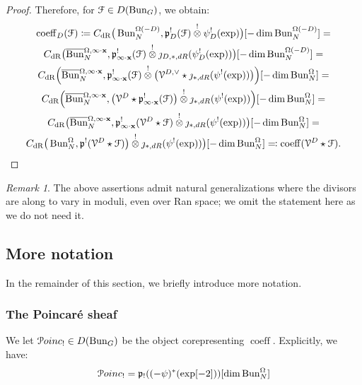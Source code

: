 \documentclass[reqno,11pt]{amsart}
\numberwithin{equation}{subsection}
\theoremstyle{remark}
\newtheorem{rem}[thm]{Remark}
\newcommand{\sF}{{\EuScript F}}
\newcommand{\sP}{{\EuScript P}}
\newcommand{\sV}{{\EuScript V}}
\newcommand{\fp}{{\mathfrak p}}
\newcommand{\on}{\operatorname}
\newcommand{\ol}[1]{\overline{#1}{}}
\newcommand{\Bun}{\on{Bun}}
\newcommand{\coeff}{\on{coeff}}
\newcommand{\Poinc}{\sP oinc}
\newcommand{\dR}{\on{dR}}
\begin{document}
\begin{proof}
Therefore, for $\sF \in D(\Bun_G)$, we obtain:
%
\[
\begin{gathered}
\coeff_D(\sF) \coloneqq 
C_{\dR}\big(\Bun_N^{\Omega(-D)},\fp_D^!(\sF) \overset{!}{\otimes} \psi_D^!(\exp)\big)
[-\dim \Bun_N^{\Omega(-D)}] = \\
C_{\dR}\big(\ol{\Bun}_N^{\Omega,\infty\cdot \bold{x}},
\fp_{\infty\cdot \bold{x}}^!(\sF) \overset{!}{\otimes} 
\jmath_{D,*,dR}(\psi_D^!(\exp))\big) 
[-\dim \Bun_N^{\Omega(-D)}] = \\
C_{\dR}\Big(\ol{\Bun}_N^{\Omega,\infty\cdot \bold{x}},
\fp_{\infty\cdot \bold{x}}^!(\sF) \overset{!}{\otimes} 
\big(\sV^{D,\vee} \star \jmath_{*,dR}(\psi^!(\exp))\big)\Big)
[-\dim \Bun_N^{\Omega}]
= \\
C_{\dR}\Big(\ol{\Bun}_N^{\Omega,\infty\cdot \bold{x}},
\big(\sV^{D} \star \fp_{\infty\cdot \bold{x}}^!(\sF)\big) \overset{!}{\otimes} 
\jmath_{*,dR}(\psi^!(\exp))\Big)
[-\dim \Bun_N^{\Omega}] = \\
C_{\dR}\big(\ol{\Bun}_N^{\Omega,\infty\cdot \bold{x}},
\fp_{\infty\cdot \bold{x}}^!(\sV^D \star \sF) \overset{!}{\otimes} 
 \jmath_{*,dR}(\psi^!(\exp))\big)
[-\dim \Bun_N^{\Omega}] = \\
C_{\dR}\big(\Bun_N^{\Omega},
\fp^!(\sV^D \star \sF)\big) \overset{!}{\otimes} 
 \jmath_{*,dR}(\psi^!(\exp))\big)
[-\dim \Bun_N^{\Omega}] \eqqcolon 
\coeff(\sV^D \star \sF).
\end{gathered}
\]

\end{proof}

\begin{rem}

The above assertions admit natural generalizations where the divisors
are along to vary in moduli, even over Ran space; we omit the statement
here as we do not need it.

\end{rem}

\subsection{More notation}

In the remainder of this section, we briefly introduce more notation.

\subsubsection{The Poincar\'e sheaf}

We let $\Poinc_! \in D(\Bun_G)$ be the object corepresenting 
$\coeff$. Explicitly, we have:
%
\begin{equation}\label{eq:poinc-!}
\Poinc_! = \fp_!((-\psi)^*(\exp[-2]))[\dim \Bun_N^{\Omega}]
\end{equation}
\end{document}
